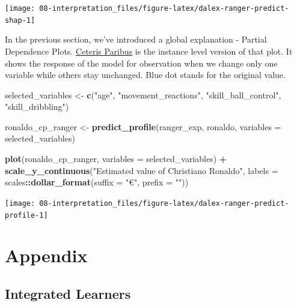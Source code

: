 \documentclass[]{scrbook}
\newenvironment{Shaded}{\begin{snugshade}}{\end{snugshade}}
\newcommand{\DataTypeTok}[1]{\textcolor[rgb]{0.13,0.29,0.53}{#1}}
\newcommand{\KeywordTok}[1]{\textcolor[rgb]{0.13,0.29,0.53}{\textbf{#1}}}
\newcommand{\NormalTok}[1]{#1}
\newcommand{\OperatorTok}[1]{\textcolor[rgb]{0.81,0.36,0.00}{\textbf{#1}}}
\newcommand{\StringTok}[1]{\textcolor[rgb]{0.31,0.60,0.02}{#1}}
\renewenvironment{Shaded} {\begin{snugshade}\small} {\end{snugshade}}
\begin{document}
\begin{center}\texttt{[image: 08-interpretation\_files/figure-latex/dalex-ranger-predict-shap-1]} \end{center}

In the previous section, we've introduced a global explanation - Partial Dependence Plots. \href{https://pbiecek.github.io/ema/ceterisParibus.html}{Ceteris Paribus} is the instance level version of that plot. It shows the response of the model for observation when we change only one variable while others stay unchanged. Blue dot stands for the original value.

\begin{Shaded}
\begin{Highlighting}[]
\NormalTok{selected_variables <-}\StringTok{ }\KeywordTok{c}\NormalTok{(}\StringTok{"age"}\NormalTok{, }\StringTok{"movement_reactions"}\NormalTok{,}
                \StringTok{"skill_ball_control"}\NormalTok{, }\StringTok{"skill_dribbling"}\NormalTok{)}

\NormalTok{ronaldo_cp_ranger <-}\StringTok{ }\KeywordTok{predict_profile}\NormalTok{(ranger_exp, ronaldo, }\DataTypeTok{variables =}\NormalTok{ selected_variables)}

\KeywordTok{plot}\NormalTok{(ronaldo_cp_ranger, }\DataTypeTok{variables =}\NormalTok{ selected_variables) }\OperatorTok{+}
\StringTok{  }\KeywordTok{scale_y_continuous}\NormalTok{(}\StringTok{"Estimated value of Christiano Ronaldo"}\NormalTok{, }\DataTypeTok{labels =}\NormalTok{ scales}\OperatorTok{::}\KeywordTok{dollar_format}\NormalTok{(}\DataTypeTok{suffix =} \StringTok{"€"}\NormalTok{, }\DataTypeTok{prefix =} \StringTok{""}\NormalTok{))}
\end{Highlighting}
\end{Shaded}

\begin{center}\texttt{[image: 08-interpretation\_files/figure-latex/dalex-ranger-predict-profile-1]} \end{center}

\hypertarget{appendix}{%
\chapter{Appendix}\label{appendix}}

\hypertarget{list-learners}{%
\section{Integrated Learners}\label{list-learners}}
\end{document}
